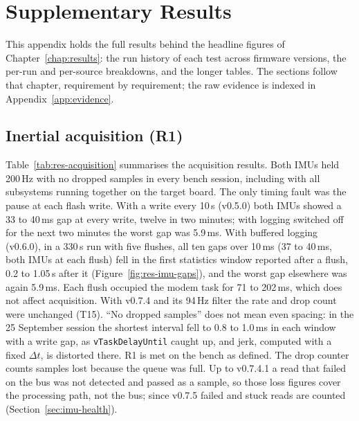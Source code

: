 \chapter{Supplementary Results}
\label{app:results}

This appendix holds the full results behind the headline figures of Chapter~\ref{chap:results}: the run history of each test across firmware versions, the per-run and per-source breakdowns, and the longer tables. The sections follow that chapter, requirement by requirement; the raw evidence is indexed in Appendix~\ref{app:evidence}.

\section{Inertial acquisition (R1)}
\label{sec:resx-acq}

Table~\ref{tab:res-acquisition} summarises the acquisition results. Both IMUs held 200\,Hz with no dropped samples in every bench session, including with all subsystems running together on the target board. The only timing fault was the pause at each flash write. With a write every 10\,s (v0.5.0) both IMUs showed a 33 to 40\,ms gap at every write, twelve in two minutes; with logging switched off for the next two minutes the worst gap was 5.9\,ms. With buffered logging (v0.6.0), in a 330\,s run with five flushes, all ten gaps over 10\,ms (37 to 40\,ms, both IMUs at each flush) fell in the first statistics window reported after a flush, 0.2 to 1.05\,s after it (Figure~\ref{fig:res-imu-gaps}), and the worst gap elsewhere was again 5.9\,ms. Each flush occupied the modem task for 71 to 202\,ms, which does not affect acquisition. With v0.7.4 and its 94\,Hz filter the rate and drop count were unchanged (T15). ``No dropped samples'' does not mean even spacing: in the 25 September session the shortest interval fell to 0.8 to 1.0\,ms in each window with a write gap, as \texttt{vTaskDelayUntil} caught up, and jerk, computed with a fixed $\Delta t$, is distorted there. R1 is met on the bench as defined. The drop counter counts samples lost because the queue was full. Up to v0.7.4.1 a read that failed on the bus was not detected and passed as a sample, so those loss figures cover the processing path, not the bus; since v0.7.5 failed and stuck reads are counted (Section~\ref{sec:imu-health}).


